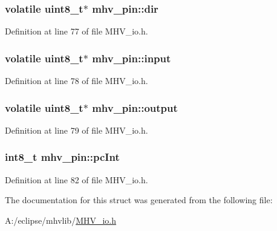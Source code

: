 \hypertarget{structmhv__pin_af92bee18d70be924e19ce2d2a6a7b14c}{
\subsubsection[{dir}]{\setlength{\rightskip}{0pt plus 5cm}volatile uint8\-\_\-t$\ast$ {\bf mhv\-\_\-pin\-::dir}}}
\label{structmhv__pin_af92bee18d70be924e19ce2d2a6a7b14c}


\-Definition at line 77 of file \-M\-H\-V\-\_\-io.\-h.

\hypertarget{structmhv__pin_a7c545d8bf340b11c799df9bc2c998076}{
\subsubsection[{input}]{\setlength{\rightskip}{0pt plus 5cm}volatile uint8\-\_\-t$\ast$ {\bf mhv\-\_\-pin\-::input}}}
\label{structmhv__pin_a7c545d8bf340b11c799df9bc2c998076}


\-Definition at line 78 of file \-M\-H\-V\-\_\-io.\-h.

\hypertarget{structmhv__pin_a5c5f34f91b6586d0603e9568900f8423}{
\subsubsection[{output}]{\setlength{\rightskip}{0pt plus 5cm}volatile uint8\-\_\-t$\ast$ {\bf mhv\-\_\-pin\-::output}}}
\label{structmhv__pin_a5c5f34f91b6586d0603e9568900f8423}


\-Definition at line 79 of file \-M\-H\-V\-\_\-io.\-h.

\hypertarget{structmhv__pin_a10252efa71e71a7e0e5ddb1d184c7101}{
\subsubsection[{pc\-Int}]{\setlength{\rightskip}{0pt plus 5cm}int8\-\_\-t {\bf mhv\-\_\-pin\-::pc\-Int}}}
\label{structmhv__pin_a10252efa71e71a7e0e5ddb1d184c7101}


\-Definition at line 82 of file \-M\-H\-V\-\_\-io.\-h.



\-The documentation for this struct was generated from the following file\-:\begin{DoxyCompactItemize}
\item 
\-A\-:/eclipse/mhvlib/\hyperlink{_m_h_v__io_8h}{\-M\-H\-V\-\_\-io.\-h}\end{DoxyCompactItemize}

